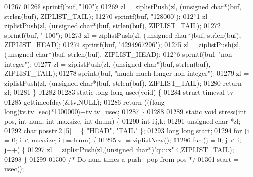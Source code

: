 \begin{DoxyCode}
{{{{{{{{{{{{{{{01267 
01268     sprintf(buf, \textcolor{stringliteral}{"100"});
01269     zl = ziplistPush(zl, (\textcolor{keywordtype}{unsigned} \textcolor{keywordtype}{char}*)buf, strlen(buf), ZIPLIST\_TAIL);
01270     sprintf(buf, \textcolor{stringliteral}{"128000"});
01271     zl = ziplistPush(zl, (\textcolor{keywordtype}{unsigned} \textcolor{keywordtype}{char}*)buf, strlen(buf), ZIPLIST\_TAIL);
01272     sprintf(buf, \textcolor{stringliteral}{"-100"});
01273     zl = ziplistPush(zl, (\textcolor{keywordtype}{unsigned} \textcolor{keywordtype}{char}*)buf, strlen(buf), ZIPLIST\_HEAD);
01274     sprintf(buf, \textcolor{stringliteral}{"4294967296"});
01275     zl = ziplistPush(zl, (\textcolor{keywordtype}{unsigned} \textcolor{keywordtype}{char}*)buf, strlen(buf), ZIPLIST\_HEAD);
01276     sprintf(buf, \textcolor{stringliteral}{"non integer"});
01277     zl = ziplistPush(zl, (\textcolor{keywordtype}{unsigned} \textcolor{keywordtype}{char}*)buf, strlen(buf), ZIPLIST\_TAIL);
01278     sprintf(buf, \textcolor{stringliteral}{"much much longer non integer"});
01279     zl = ziplistPush(zl, (\textcolor{keywordtype}{unsigned} \textcolor{keywordtype}{char}*)buf, strlen(buf), ZIPLIST\_TAIL);
01280     \textcolor{keywordflow}{return} zl;
01281 \}
01282 
01283 \textcolor{keyword}{static} \textcolor{keywordtype}{long} \textcolor{keywordtype}{long} usec(\textcolor{keywordtype}{void}) \{
01284     \textcolor{keyword}{struct} timeval tv;
01285     gettimeofday(&tv,NULL);
01286     \textcolor{keywordflow}{return} (((\textcolor{keywordtype}{long} \textcolor{keywordtype}{long})tv.tv\_sec)*1000000)+tv.tv\_usec;
01287 \}
01288 
01289 \textcolor{keyword}{static} \textcolor{keywordtype}{void} stress(\textcolor{keywordtype}{int} pos, \textcolor{keywordtype}{int} num, \textcolor{keywordtype}{int} maxsize, \textcolor{keywordtype}{int} dnum) \{
01290     \textcolor{keywordtype}{int} i,j,k;
01291     \textcolor{keywordtype}{unsigned} \textcolor{keywordtype}{char} *zl;
01292     \textcolor{keywordtype}{char} posstr[2][5] = \{ \textcolor{stringliteral}{"HEAD"}, \textcolor{stringliteral}{"TAIL"} \};
01293     \textcolor{keywordtype}{long} \textcolor{keywordtype}{long} start;
01294     \textcolor{keywordflow}{for} (i = 0; i < maxsize; i+=dnum) \{
01295         zl = ziplistNew();
01296         \textcolor{keywordflow}{for} (j = 0; j < i; j++) \{
01297             zl = ziplistPush(zl,(\textcolor{keywordtype}{unsigned} \textcolor{keywordtype}{char}*)\textcolor{stringliteral}{"quux"},4,ZIPLIST\_TAIL);
01298         \}
01299 
01300         \textcolor{comment}{/* Do num times a push+pop from pos */}
01301         start = usec();
}}}}}}}}}}}}}}}
\end{DoxyCode}
